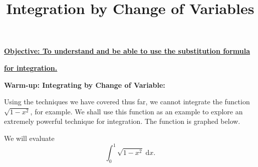 \documentclass{article}
\newcommand{\diff}{\;\mathrm{d}}
\begin{document}
\title{Integration by Change of Variables}
\date{}

\maketitle
\thispagestyle{empty}

\Large

\textbf{\underline{Objective: To understand and be able to use the substitution formula}}

\textbf{\underline{for integration.}}







\vspace{5mm}




\textbf{Warm-up: Integrating by Change of Variable:}\bigskip

Using the techniques we have covered thus far, we cannot integrate the function $\sqrt{1-x^2}$, for example. We shall use this function as an example to explore an extremely powerful technique for integration. The function is graphed below.

\begin{center}
\end{center}

We will evaluate
\[\int_0^1 \sqrt{1-x^2}\diff x.\]
\end{document}
